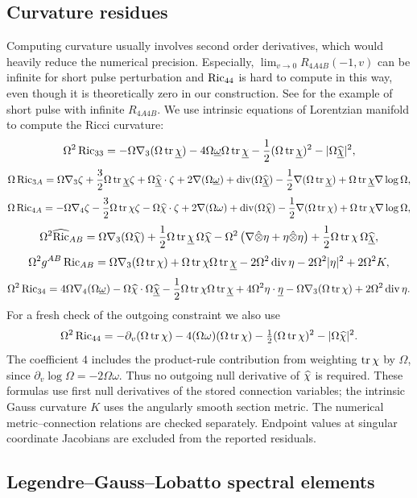 \subsection{Curvature residues}
Computing curvature usually involves second order derivatives, which would heavily reduce the numerical precision. 
Especially, $\lim_{v\rightarrow 0}R_{4A4B}(-1,v)$ can be infinite for short pulse perturbation and $\operatorname{Ric}_{44}$ is hard to compute in this way, even though it is theoretically zero in our construction.
See \cite{an-25} for the example of short pulse with infinite $R_{4A4B}$.
We use intrinsic equations of Lorentzian manifold to compute the Ricci curvature:
\[\Omega^2\operatorname{Ric}_{33}=-\Omega\nabla_3(\Omega\operatorname{tr}\underline\chi)-4\Omega\underline\omega\Omega\operatorname{tr}\underline\chi-\frac{1}{2}(\Omega\operatorname{tr}\underline\chi)^2-|\Omega\widehat{\underline\chi}|^2,\]
\[\Omega\operatorname{Ric}_{3A}=\Omega\nabla_3\zeta+\frac{3}{2}\Omega\operatorname{tr}\underline\chi\zeta+\Omega\widehat{\underline\chi}\cdot\zeta+2\nabla(\Omega\underline\omega)+\operatorname{div}(\Omega\widehat{\underline\chi})-\frac{1}{2}\nabla(\Omega\operatorname{tr}\underline\chi)+\Omega\operatorname{tr}\underline\chi\nabla\log\Omega,\]
\[\Omega\operatorname{Ric}_{4A}=-\Omega\nabla_4\zeta-\frac{3}{2}\Omega\operatorname{tr}\chi\zeta-\Omega\widehat\chi\cdot\zeta+2\nabla(\Omega\omega)+\operatorname{div}(\Omega\widehat\chi)-\frac{1}{2}\nabla(\Omega\operatorname{tr}\chi)+\Omega\operatorname{tr}\chi\nabla\log\Omega,\]
\[\Omega^2\widehat{\operatorname{Ric}}_{AB}=\Omega\nabla_3(\Omega\widehat\chi)+\frac{1}{2}\Omega\operatorname{tr}\underline\chi\,\Omega\widehat\chi-\Omega^2\left(\nabla\hat\otimes\eta+\eta\hat\otimes\eta\right)+\frac{1}{2}\Omega\operatorname{tr}\chi\,\Omega\widehat{\underline\chi},\]
\[ \Omega^2g^{AB}\operatorname{Ric}_{AB}=\Omega\nabla_3(\Omega\operatorname{tr}\chi)+\Omega\operatorname{tr}\chi\Omega\operatorname{tr}\underline\chi-2\Omega^2\operatorname{div}\eta-2\Omega^2|\eta|^2+2\Omega^2K,\]
\[\Omega^2\operatorname{Ric}_{34}=4\Omega\nabla_4(\Omega\underline\omega)-\Omega\widehat\chi\cdot\Omega\widehat{\underline\chi}-\frac{1}{2}\Omega\operatorname{tr}\chi\Omega\operatorname{tr}\underline\chi+4\Omega^2\eta\cdot\underline\eta -\Omega\nabla_3(\Omega\operatorname{tr}\chi)+2\Omega^2\operatorname{div}\eta.\]
For a fresh check of the outgoing constraint we also use
\[
 \Omega^2\operatorname{Ric}_{44}=-\partial_v(\Omega\operatorname{tr}\chi)
 -4(\Omega\omega)(\Omega\operatorname{tr}\chi)
 -\tfrac12(\Omega\operatorname{tr}\chi)^2-|\Omega\widehat\chi|^2.
\]
The coefficient $4$ includes the product-rule contribution from weighting
$\operatorname{tr}\chi$ by $\Omega$, since $\partial_v\log\Omega=-2\Omega\omega$.
Thus no outgoing null derivative of $\widehat\chi$ is required.  These formulas use
first null derivatives of the stored connection variables; the intrinsic
Gauss curvature $K$ uses the angularly smooth section metric.  The numerical
metric--connection relations are checked separately.  Endpoint values at
singular coordinate Jacobians are excluded from the reported residuals.

\subsection{Legendre--Gauss--Lobatto spectral elements}

